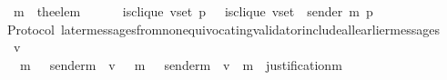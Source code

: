 \begin{isabellebody}
\ \ {\isasymlongrightarrow}\ m{\isacharprime}\ {\isacharequal}\ the{\isacharunderscore}elem\ {\isacharparenleft}{\isasymsigma}{\isacharprime}\ {\isacharminus}\ {\isasymsigma}{\isacharparenright}\isanewline
\ \ {\isasymlongrightarrow}\ is{\isacharunderscore}clique\ {\isacharparenleft}v{\isacharunderscore}set{\isacharcomma}\ p{\isacharcomma}\ {\isasymsigma}{\isacharparenright}\ {\isacharequal}\ is{\isacharunderscore}clique\ {\isacharparenleft}v{\isacharunderscore}set\ {\isacharminus}\ {\isacharbraceleft}sender\ m{\isacharprime}{\isacharbraceright}{\isacharcomma}\ p{\isacharcomma}\ {\isasymsigma}{\isacharprime}{\isacharparenright}{\isachardoublequoteclose}\isanewline
%
\isadelimproof
\ \ %
\endisadelimproof
%
\isatagproof
{}\isamarkupfalse%
%
\endisatagproof
{\isafoldproof}%
%
\isadelimproof
\isanewline
%
\endisadelimproof
\isanewline
\isanewline
\isanewline
\isanewline
{}\isamarkupfalse%
\ {\isacharparenleft}\ Protocol{\isacharparenright}\ later{\isacharunderscore}messages{\isacharunderscore}from{\isacharunderscore}non{\isacharunderscore}equivocating{\isacharunderscore}validator{\isacharunderscore}include{\isacharunderscore}all{\isacharunderscore}earlier{\isacharunderscore}messages\ {\isacharcolon}\isanewline
\ \ {\isachardoublequoteopen}{\isasymforall}\ v\ {\isasymsigma}\ {\isasymsigma}{}\ {\isasymsigma}{}{\isachardot}\ {\isasymsigma}\ {\isasymin}\ {\isasymSigma}\ {\isasymand}\ {\isasymsigma}{}\ {\isasymin}\ {\isasymSigma}\ {\isasymand}\ {\isasymsigma}{}\ {\isasymsubseteq}\ {\isasymsigma}\ {\isasymand}\ {\isasymsigma}{}\ {\isasymsubseteq}\ {\isasymsigma}\ {\isasymand}\ {\isasymsigma}{}\ {\isasyminter}\ {\isasymsigma}{}\ {\isacharequal}\ {\isasymemptyset}\isanewline
\ \ {\isasymlongrightarrow}\ {\isacharparenleft}{\isasymforall}\ m{}\ {\isasymin}\ {\isasymsigma}{}{\isachardot}\ sender{\isacharparenleft}m{}{\isacharparenright}\ {\isacharequal}\ v\ {\isasymlongrightarrow}\ {\isacharparenleft}{\isasymforall}\ m{}\ {\isasymin}\ {\isasymsigma}{}{\isachardot}\ sender{\isacharparenleft}m{}{\isacharparenright}\ {\isacharequal}\ v\ {\isasymlongrightarrow}\ m{}\ {\isasymin}\ justification{\isacharparenleft}m{}{\isacharparenright}{\isacharparenright}{\isacharparenright}{\isachardoublequoteclose}\isanewline
%
\isadelimproof
\ \ %
\endisadelimproof
%
\isatagproof
{}\isamarkupfalse%
%
\endisatagproof
{\isafoldproof}%
%
\isadelimproof

\end{isabellebody}
